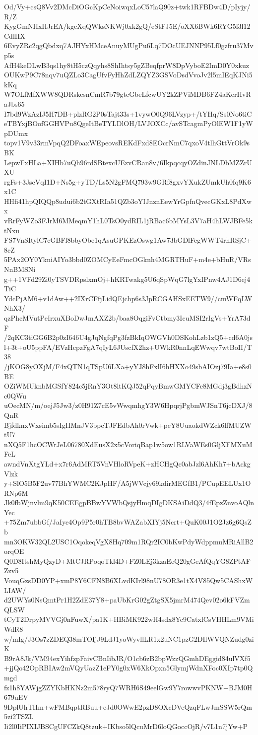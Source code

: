 Od/Vy+csQ8Vv2DMcDiOGcKpCeNoiwqxLoC57laQ90z+twk1RFBDw4D/pIyjy/R/Z
KygGmNHxHJrEA/kgcXqQWksNKWj0xk2gQ/eStFJ5E/oXX6BWk6RYG5l3l12CdlHX
6EvyZRc2qgQbdxq7AJHYxHMceAnuyMUgPu6Lq7DOcUEJNNP95Lf0gzfru37Mvp5s
AfH4keDLwB3qs1hy8tH5czQqyhs8ShIhtsy5gZBeqfprW8DpVyboE2ImD0Y0xkuz
OUKwP9C78nqv7uQZLo3CagUfvFyHhZdLZQYZ3GSVoDsdVvoJv2l5mIEqKJNi5kKq
W7OLfMfXWW8QDRskesnCmR7b79gtcGbeLfcwUY2kZPViMDB6FZ4aKerHvRaJbs65
I7bd9WzAzIJ5H7DB+plzRG2P0sTajt33s+1vywO0Q96LVzyp+/tYHq/Ss0No6tiC
eTBYxjBOofGGHVPu8QgeItBeTYLDlOH/LVJOXCc/avSTcagmPyOlEW1F1yWpDUmx
topv1V9v33rmVpqQ2DFoaxWEpeovsREKdFxd8EOcrNmC7qxoV4tlhGttVrOk9sBK
LepwFxHLa+XIHb7uQh96rdSBtexcUEzvCRan8v/6IkpqcqyOZdinJNLDbMZZrUXU
rgFs+3JscVqI1D+Ns5g+yTD/Ls5N2gFMQ793w9GRf8gxvYXukZUmkUh0fq9K6x1C
HHfi41hpQIQQp8udui6b2tGXtRIa51QZb3oYIJnznEewYrGpfnQvecGKxL8PdXwx
vRrFyWZo3FJrM6MMeqmY1hL0TsO0ydRIL1jRBac6bMYsL3V7aH4hLWJBFe5ktNxu
FS7VnSItylC7cGBFl8bbyObe1qAsuGPKEzOswg1Aw73bGDlFcgWWT4rhRSjC+8cZ
5PAx2OY0YkniAIYo3bbd0ZOMCyEeFmcOGknh4MGRTHuF+m4e+bHuR/VRsNnBMSNi
g++1VFd29Zi0yTSVDRpslxmOj+hKRTwakg5U6qSpWqG7lgYxIPnw4AJ1D6ej4TiC
YdcPjAM6+v1dAw++2IXrCFfjLidQEjcbp6s3JpRCGAHSxEETW9//cmWFqLWNhX3/
qzPhcMVutPeIrxuXBoDwJmAXZ2b/baa8OqgiFvCtbmy3IcuMSI2rIgVs+YrA73dF
/2qKC3tiGG6B2p0zI646U4gJqNgfqPg3fzBkIqOWGVh0DSKohLzb1zQ5+cd6A0js
l+3t+oU5ppFA/EVzHcpzFgA7qIyL6JUscfX2hz+UWkR0nnLqEWwqv7wtBoII/T38
/jKOG8yOXjM/F4xQTN1qTSpU6LXa+yYJ8hFxlI6hHXXo49sbAIOzj79Ia+e8s0BE
OZiWMUknbMGSfY824c5jRnY3Ot8ltKQJ52qPqyBmwGMYCFe8MGdj3gBdhzNc0QWu
uOecMN/m/oejJ5Jw3/z0H91Z7cE5vWwqmhgY3W6HpqrjPgbmWJSnT6jcDXJ/8QnR
BjfdknxWxsimb5sIgHMnJV3bpcTJFEdbAh0rVwk+peY8UuaokdWZck6lfMUZWtU7
nXQ5F1hcOCWrJeL06780XdEusX2x5cVoriqBap1w5ow1RLVaWEs0GljXFMXuMFeL
awndVnXtgYLd+x7r6AdMRT5VnVHloRVpeK+zHCHgQc0abJzl6AhKh7+bAckgVlzk
y+SlO5B5F2uv77BhYWMC2KJpHF/A5jWVcjy69kdirMEGfB1/PCupEELUx1ORNp6M
Jk0fbWjnvlm9qK50CEEgpBBwYVWbQsjyHmqDIgDKSAiDdQ3/4fEpzZnvoAQlnYec
+75Zm7ubbGf/JaIye4Op9P5r0hTB8bvWAZabXIYj5Ncrt+QuK00J1O2Jz6g6QsZb
mn3OKW32QL2USC1OqokeqVgX8Hq709m1RQr2IC0bKwPdyWdppmuMRiAllB2orqOE
Q0D8ItshMyQzyD+MtCJRPoqoTkl4D+FZ0LEj3kzaEeQ20gGeAfQqYG8ZPtAFZzv5
VouqGzsDD0YP+xmP8Y6CFN8B6XLvdKIrl98nU78OR3e1tX4V85Qw5CAShxWLIAW/
d2UWYs0NsQmtPr1H2ZdE37Y8+paUbKrG02gZtgSX5jmrM474Qev02o6kFVZmQLSW
tCyT2DrpyMVVGj0nFuwX/pa1K+HBiMK922wH4sdx8Yc9CatxlCsVHHLm9VMiWdR8
w/mIg/J3Os7zZDEQ38mTOIjJ9LdJ1yoWyvllLR1x2uNC1pzG2DIlWVQNZudg0ziK
B9rA8Jk/VM94exYihfzpFaivCBnIibJR/O1cb6zB2bpWzzQGmhDEggid84ulVXf5
+jjQo42OpRBIAw2mVQyUazZ1eFY0g0xW6XkOpxn5GlymjWdnXFoc0XIp7tp0Qmgd
fz1h8YAWjgZZYKbHKNz2m578ryQ7WRH6S49eelGw9Y7rowwvPKNW+BJM0H679uEV
9DplUhTHm+wFMBqptRBuu+eJd0OWwE2pzD8OXcDVeQzqFLwJmSSW5rQm5zi2TSZL
Ii2l0IiPIXIJBSCgUFCZkQ8tzuk+IKbso5lQcuMrD6loQGoccOjR/v7L1n7jYw+P
